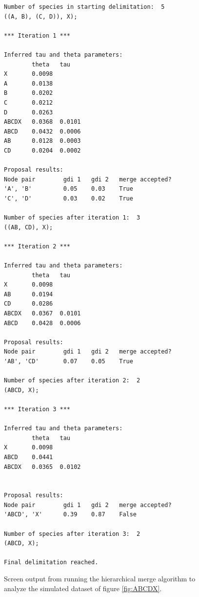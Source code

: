 \documentclass{article1}
\begin{document}
\begin{figure}
\centering
\footnotesize

\begin{verbatim}
Number of species in starting delimitation:  5
((A, B), (C, D)), X);

*** Iteration 1 ***

Inferred tau and theta parameters:
        theta   tau
X       0.0098	
A       0.0138	
B       0.0202	
C       0.0212	
D       0.0263	
ABCDX   0.0368  0.0101
ABCD    0.0432  0.0006
AB      0.0128  0.0003
CD      0.0204  0.0002

Proposal results:
Node pair        gdi 1   gdi 2   merge accepted?
'A', 'B'         0.05    0.03    True
'C', 'D'         0.03    0.02    True

Number of species after iteration 1:  3
((AB, CD), X);

*** Iteration 2 ***

Inferred tau and theta parameters:
        theta   tau
X       0.0098	
AB      0.0194	
CD      0.0286	
ABCDX   0.0367  0.0101
ABCD    0.0428  0.0006

Proposal results:
Node pair        gdi 1   gdi 2   merge accepted?
'AB', 'CD'       0.07    0.05    True 

Number of species after iteration 2:  2
(ABCD, X);

*** Iteration 3 ***

Inferred tau and theta parameters:
        theta   tau
X       0.0098
ABCD    0.0441	
ABCDX   0.0365  0.0102


Proposal results:
Node pair        gdi 1   gdi 2   merge accepted?
'ABCD', 'X'      0.39    0.87    False

Number of species after iteration 3:  2
(ABCD, X);

Final delimitation reached.
\end{verbatim}
 
\caption{Screen output from running the hierarchical merge algorithm to analyze the
simulated dataset of figure \ref{fig:ABCDX}. %
} \label{fig:ABCDX_text_out}
\end{figure}
\end{document}

